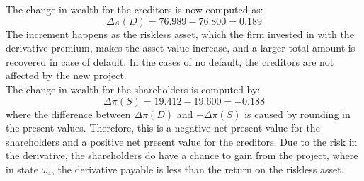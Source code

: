 \documentclass[../main.tex]{subfiles}
\begin{document}
            The change in wealth for the creditors is now computed as:
            \begin{equation}
                \Delta \pi(D) = 76.989 - 76.800 = 0.189
            \end{equation}
            The increment happens as the riskless asset, which the firm invested in with the derivative premium, 
            makes the asset value increase, and a larger total amount is recovered in case of default. 
            In the cases of no default, the creditors are not affected by the new project.\\
            The change in wealth for the shareholders is computed by:
            \begin{equation}
                \Delta \pi(S) = 19.412 - 19.600 = -0.188
            \end{equation}
            where the difference between $\Delta \pi(D)$ and $-\Delta \pi(S)$ is caused by rounding in the present values. 
            Therefore, this is a negative net present value for the shareholders 
            and a positive net present value for the creditors. 
            Due to the risk in the derivative, the shareholders do have a chance to gain from the project, 
            where in state $\omega_4$, the derivative payable is less than the return on the riskless asset.
\end{document}
